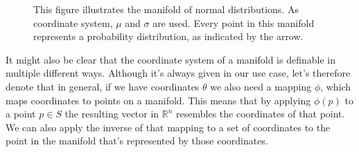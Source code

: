 \begin{figure}
	\centering
{}
\caption{This figure illustrates the manifold of normal distributions. As coordinate system, $\mu$ and $\sigma$ are used. Every point in this manifold represents a probability distribution, as indicated by the arrow. \label{fig:NormalDistributionManifold}}
\end{figure}
It might also be clear that the coordinate system of a manifold is definable in multiple different ways. Although it's always given in our use case, let's therefore denote that in general, if we have coordinates $\theta$ we also need a mapping $\phi$, which maps coordinates to points on a manifold. This means that by applying $\phi(p)$ to a point $p\in S$ the resulting vector in $\mathbb{R}^n$ resembles the coordinates of that point. We can also apply the inverse of that mapping to a set of coordinates to the point in the manifold that's represented by those coordinates.

